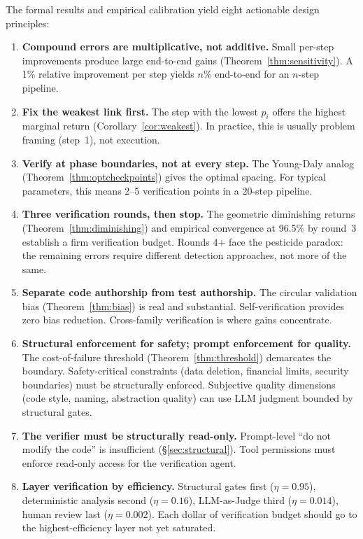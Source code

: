 \documentclass[11pt, a4paper, logo, copyright]{googledeepmind}
\begin{document}
The formal results and empirical calibration yield eight actionable design principles:

\begin{enumerate}

\item \textbf{Compound errors are multiplicative, not additive.}
Small per-step improvements produce large end-to-end gains (Theorem~\ref{thm:sensitivity}).
A 1\% relative improvement per step yields $n$\% end-to-end for an $n$-step pipeline.

\item \textbf{Fix the weakest link first.}
The step with the lowest $p_i$ offers the highest marginal return (Corollary~\ref{cor:weakest}).
In practice, this is usually problem framing (step~1), not execution.

\item \textbf{Verify at phase boundaries, not at every step.}
The Young-Daly analog (Theorem~\ref{thm:optcheckpoints}) gives the optimal spacing.
For typical parameters, this means 2--5 verification points in a 20-step pipeline.

\item \textbf{Three verification rounds, then stop.}
The geometric diminishing returns (Theorem~\ref{thm:diminishing}) and empirical convergence at 96.5\% by round~3 establish a firm verification budget.
Rounds 4+ face the pesticide paradox: the remaining errors require different detection approaches, not more of the same.

\item \textbf{Separate code authorship from test authorship.}
The circular validation bias (Theorem~\ref{thm:bias}) is real and substantial.
Self-verification provides zero bias reduction.
Cross-family verification is where gains concentrate.

\item \textbf{Structural enforcement for safety; prompt enforcement for quality.}
The cost-of-failure threshold (Theorem~\ref{thm:threshold}) demarcates the boundary.
Safety-critical constraints (data deletion, financial limits, security boundaries) must be structurally enforced.
Subjective quality dimensions (code style, naming, abstraction quality) can use LLM judgment bounded by structural gates.

\item \textbf{The verifier must be structurally read-only.}
Prompt-level ``do not modify the code'' is insufficient (\S\ref{sec:structural}).
Tool permissions must enforce read-only access for the verification agent.

\item \textbf{Layer verification by efficiency.}
Structural gates first ($\eta = 0.95$), deterministic analysis second ($\eta = 0.16$), LLM-as-Judge third ($\eta = 0.014$), human review last ($\eta = 0.002$).
Each dollar of verification budget should go to the highest-efficiency layer not yet saturated.

\end{enumerate}
\end{document}
